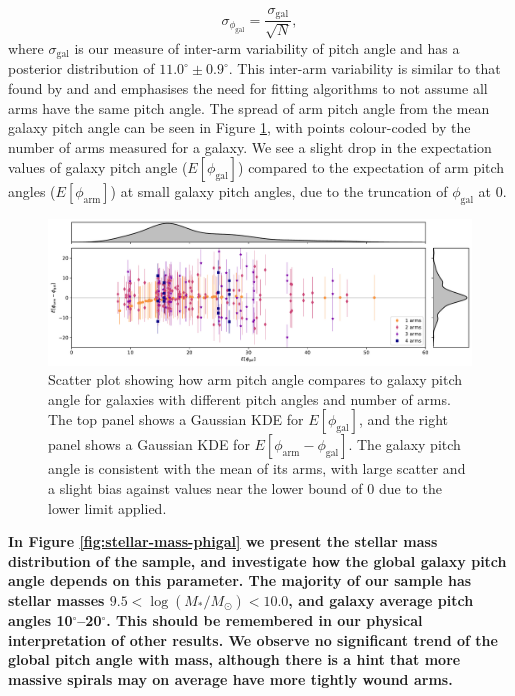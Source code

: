 \begin{equation}
  \sigma_{\phi_\mathrm{gal}} = \frac{\sigma_\mathrm{gal}}{\sqrt{N}},
\end{equation}
where $\sigma_\mathrm{gal}$ is our measure of inter-arm variability of pitch angle and has a posterior distribution of $11.0^\circ\pm 0.9^\circ$. This inter-arm variability is similar to that found by \citet{1981AJ.....86.1847K} and \citet{2014ApJ...790...87D} and emphasises the need for fitting algorithms to not assume all arms have the same pitch angle. The spread of arm pitch angle from the mean galaxy pitch angle can be seen in Figure \ref{fig:arm-pa-spread}, with points colour-coded by the number of arms measured for a galaxy. We see a slight drop in the expectation values of galaxy pitch angle ($E[\phi_\mathrm{gal}]$) compared to the expectation of arm pitch angles ($E[\phi_\mathrm{arm}]$) at small galaxy pitch angles, due to the truncation of $\phi_\mathrm{gal}$ at {0\degree}.

\begin{figure}
  \includegraphics[width=17.7cm]{plots/arm_pa_spread.pdf}
  \caption{Scatter plot showing how arm pitch angle compares to galaxy pitch angle for galaxies with different pitch angles and number of arms. The top panel shows a Gaussian KDE for $E[\phi_\mathrm{gal}]$, and the right panel shows a Gaussian KDE for $E[\phi_\mathrm{arm} - \phi_\mathrm{gal}]$. The galaxy pitch angle is consistent with the mean of its arms, with large scatter and a slight bias against values near the lower bound of $0$ due to the lower limit applied.}
  \label{fig:arm-pa-spread}
\end{figure}

\textbf{In Figure \ref{fig:stellar-mass-phigal} we present the stellar mass distribution of the sample, and investigate how the global galaxy pitch angle depends on this parameter. The majority of our sample has stellar masses $9.5 < \log(M_* / M_\odot) < 10.0$, and galaxy average pitch angles 10$^\circ$--20$^\circ$. This should be remembered in our physical interpretation of other results. We observe no significant trend of the global pitch angle with mass, although there is a hint that more massive spirals may on average have more tightly wound arms. }

